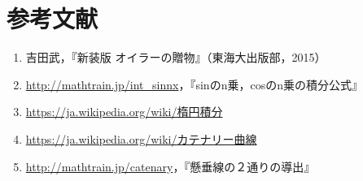 \section*{参考文献}
\begin{enumerate}
  \item	吉田武，『新装版 オイラーの贈物』（東海大出版部，2015）
  \item \url{http://mathtrain.jp/int_sinnx}，『sinのn乗，cosのn乗の積分公式』
  \item \url{https://ja.wikipedia.org/wiki/楕円積分}
  \item \url{https://ja.wikipedia.org/wiki/カテナリー曲線}
  \item \url{http://mathtrain.jp/catenary}，『懸垂線の２通りの導出』
\end{enumerate}
